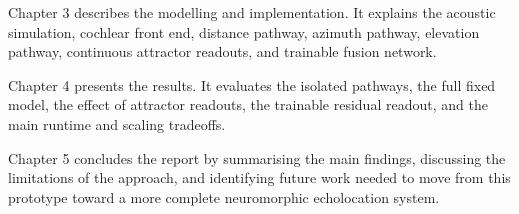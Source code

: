 Chapter 3 describes the modelling and implementation. It explains the acoustic simulation, cochlear front end, distance pathway, azimuth pathway, elevation pathway, continuous attractor readouts, and trainable fusion network.

Chapter 4 presents the results. It evaluates the isolated pathways, the full fixed model, the effect of attractor readouts, the trainable residual readout, and the main runtime and scaling tradeoffs.

Chapter 5 concludes the report by summarising the main findings, discussing the limitations of the approach, and identifying future work needed to move from this prototype toward a more complete neuromorphic echolocation system.
